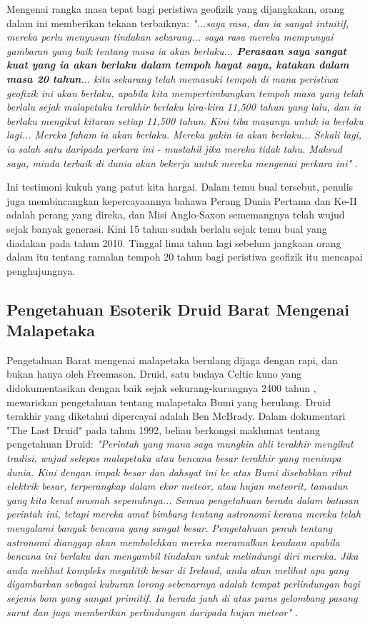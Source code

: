 \documentclass[10pt,twocolumn,letterpaper]{article}
\begin{document}
Mengenai rangka masa tepat bagi peristiwa geofizik yang dijangkakan, orang dalam ini memberikan tekaan terbaiknya: \textit{"...saya rasa, dan ia sangat intuitif, mereka perlu menyusun tindakan sekarang... saya rasa mereka mempunyai gambaran yang baik tentang masa ia akan berlaku... \textbf{Perasaan saya sangat kuat yang ia akan berlaku dalam tempoh hayat saya, katakan dalam masa 20 tahun}... kita sekarang telah memasuki tempoh di mana peristiwa geofizik ini akan berlaku, apabila kita mempertimbangkan tempoh masa yang telah berlalu sejak malapetaka terakhir berlaku kira-kira 11,500 tahun yang lalu, dan ia berlaku mengikut kitaran setiap 11,500 tahun. Kini tiba masanya untuk ia berlaku lagi... Mereka faham ia akan berlaku. Mereka yakin ia akan berlaku... Sekali lagi, ia salah satu daripada perkara ini - mustahil jika mereka tidak tahu. Maksud saya, minda terbaik di dunia akan bekerja untuk mereka mengenai perkara ini"} \cite{4}.

Ini testimoni kukuh yang patut kita hargai. Dalam temu bual tersebut, penulis juga membincangkan kepercayaannya bahawa Perang Dunia Pertama dan Ke-II adalah perang yang direka, dan Misi Anglo-Saxon sememangnya telah wujud sejak banyak generasi. Kini 15 tahun sudah berlalu sejak temu bual yang diadakan pada tahun 2010. Tinggal lima tahun lagi sebelum jangkaan orang dalam itu tentang ramalan tempoh 20 tahun bagi peristiwa geofizik itu mencapai penghujungnya.
\subsection{Pengetahuan Esoterik Druid Barat Mengenai Malapetaka}

Pengetahuan Barat mengenai malapetaka berulang dijaga dengan rapi, dan bukan hanya oleh Freemason. Druid, satu budaya Celtic kuno yang didokumentasikan dengan baik sejak sekurang-kurangnya 2400 tahun \cite{7}, mewariskan pengetahuan tentang malapetaka Bumi yang berulang. Druid terakhir yang diketahui dipercayai adalah Ben McBrady. Dalam dokumentari "The Last Druid" pada tahun 1992, beliau berkongsi maklumat tentang pengetahuan Druid: \textit{"Perintah yang mana saya mungkin ahli terakhir mengikut tradisi, wujud selepas malapetaka atau bencana besar terakhir yang menimpa dunia. Kini dengan impak besar dan dahsyat ini ke atas Bumi disebabkan ribut elektrik besar, terperangkap dalam ekor meteor, atau hujan meteorit, tamadun yang kita kenal musnah sepenuhnya... Semua pengetahuan berada dalam batasan perintah ini, tetapi mereka amat bimbang tentang astronomi kerana mereka telah mengalami banyak bencana yang sangat besar. Pengetahuan penuh tentang astronomi dianggap akan membolehkan mereka meramalkan keadaan apabila bencana ini berlaku dan mengambil tindakan untuk melindungi diri mereka. Jika anda melihat kompleks megalitik besar di Ireland, anda akan melihat apa yang digambarkan sebagai kuburan lorong sebenarnya adalah tempat perlindungan bagi sejenis bom yang sangat primitif. Ia berada jauh di atas paras gelombang pasang surut dan juga memberikan perlindungan daripada hujan meteor"} \cite{8,9}.
\end{document}

